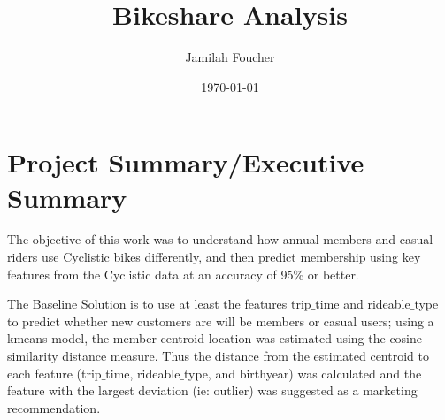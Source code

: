 \documentclass[11pt, onecolumn]{article}
\title{Bikeshare Analysis}	%
\author{Jamilah Foucher \\	%
}
\date{\today}	%
\begin{document}

\maketitle		%

\thispagestyle{empty}	%




\newpage				%

\tableofcontents		        %

\newpage				%



\section{Project Summary/Executive Summary}

The objective of this work was to understand how annual members and casual riders use Cyclistic bikes diﬀerently, and then predict membership using key features from the Cyclistic data at an accuracy of 95\% or better. 

The Baseline Solution is to use at least the features trip$\_$time and rideable$\_$type to predict whether new customers are will be members or casual users; using a kmeans model, the member centroid location was estimated using the cosine similarity distance measure. Thus the distance from the estimated centroid to each feature (trip$\_$time, rideable$\_$type, and birthyear) was calculated and the feature with the largest deviation (ie: outlier) was suggested as a marketing recommendation.  
\end{document}
